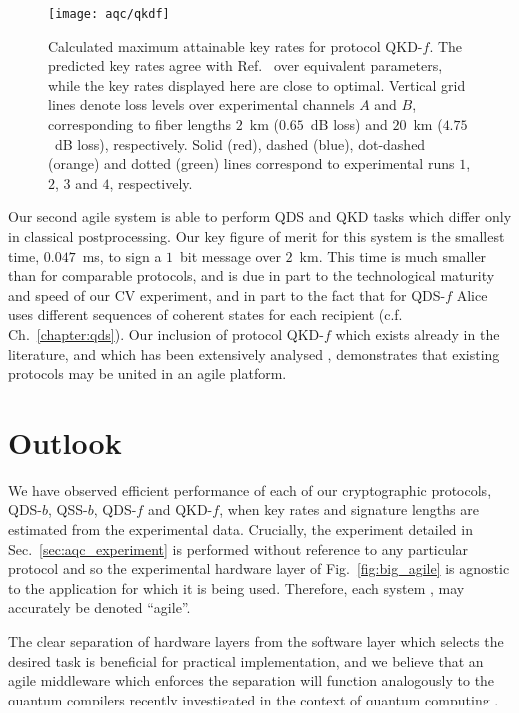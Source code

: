 \begin{figure}[htp]
\centering
\captionsetup{width=\linewidth}
\texttt{[image: aqc/qkdf]}
\caption{\label{fig:aqc_qkdf} Calculated maximum attainable key rates for protocol QKD-$f$. The predicted key rates agree with Ref.~\cite{Papanastasiou2018} over equivalent parameters, while the key rates displayed here are close to optimal. Vertical grid lines denote loss levels over experimental channels $A$ and $B$, corresponding to fiber lengths $2$~km ($0.65$~dB loss) and $20$~km ($4.75$~dB loss), respectively. Solid (red), dashed (blue), dot-dashed (orange) and dotted (green) lines correspond to experimental runs $1$, $2$, $3$ and $4$, respectively.}
\end{figure}


Our second agile system \systemF \; is able to perform QDS and QKD tasks which differ only in classical postprocessing. Our key figure of merit for this system is the smallest time, $0.047$~ms, to sign a $1$~bit message over $2$~km. This time is much smaller than for comparable protocols, and is due in part to the technological maturity and speed of our CV experiment, and in part to the fact that for QDS-$f$ Alice uses different sequences of coherent states for each recipient (c.f. Ch.~\ref{chapter:qds}). Our inclusion of protocol QKD-$f$ which exists already in the literature, and which has been extensively analysed \cite{Leverrier2011, Papanastasiou2018, Ghorai2019, Lin2019}, demonstrates that existing protocols may be united in an agile platform.


\FloatBarrier
\section{Outlook}
We have observed efficient performance of each of our cryptographic protocols, QDS-$b$, QSS-$b$, QDS-$f$ and QKD-$f$, when key rates and signature lengths are estimated from the experimental data. Crucially, the experiment detailed in Sec.~\ref{sec:aqc_experiment} is performed without reference to any particular protocol and so the experimental hardware layer of Fig.~\ref{fig:big_agile} is agnostic to the application for which it is being used. Therefore, each system \systemB, \systemF \; may accurately be denoted ``agile''.

The clear separation of hardware layers from the software layer which selects the desired task is beneficial for practical implementation, and we believe that an agile middleware which enforces the separation will function analogously to the quantum compilers recently investigated in the context of quantum computing \cite{Killoran2018, qiskit, Murali2019}. Future quantum cryptographic protocols should be designed and optimized towards agility, and it should be possible to group additional existing cryptosystems into further agile systems for implementation.


